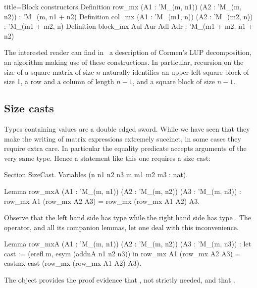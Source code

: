 \begin{coq}{}{title=Block constructors}
Definition row_mx (A1 : 'M_(m, n1)) (A2 : 'M_(m, n2)) : 'M_(m, n1 + n2)
Definition col_mx (A1 : 'M_(m1, n)) (A2 : 'M_(m2, n)) : 'M_(m1 + m2, n)
Definition block_mx Aul Aur Adl Adr : 'M_(m1 + m2, n1 + n2)
\end{coq}

The interested reader can find in~\cite{packedclasses}
a description of Cormen's LUP decomposition, an algorithm
making use of these constructions.  In particular, recursion
on the size of a square matrix of size $n$ naturally identifies
an upper left square block of size 1, a row and a column of length $n-1$,
and a square block of size $n-1$.

\subsection{Size casts}\label{sec:castmx}


Types containing values are a double edged sword.  While we have seen that
they make the writing of matrix expressions extremely succinct, in
some cases
they require extra care.  In particular the equality predicate accepts
arguments of the very same type.  Hence a statement like this one
requires a size cast:

\begin{coq}{}{}
Section SizeCast.
Variables (n n1 n2 n3 m m1 m2 m3 : nat).

Lemma row_mxA (A1 : 'M_(m, n1)) (A2 : 'M_(m, n2)) (A3 : 'M_(m, n3)) :
  row_mx A1 (row_mx A2 A3) = row_mx (row_mx A1 A2) A3.
\end{coq}

Observe that the left hand side has type  while
the right hand side has type .  The
 operator, and all its companion lemmas, let one deal with
this inconvenience.

\begin{coq}{}{}
Lemma row_mxA (A1 : 'M_(m, n1)) (A2 : 'M_(m, n2)) (A3 : 'M_(m, n3)) :
  let cast := (erefl m, esym (addnA n1 n2 n3)) in
  row_mx A1 (row_mx A2 A3) = castmx cast (row_mx (row_mx A1 A2) A3).
\end{coq}
The  object provides the proof evidence that , not
strictly needed, and that .

